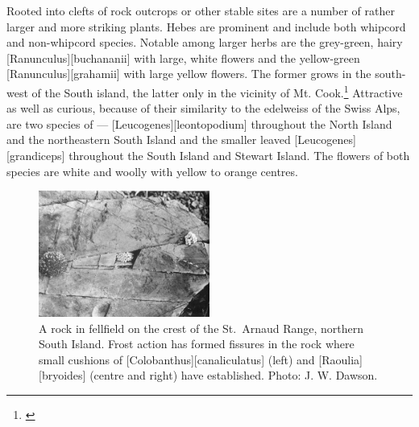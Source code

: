 Rooted into clefts of rock outcrops or other stable sites are a number of rather larger and more striking plants.
Hebes are prominent and include both whipcord and non-whipcord species.
Notable among larger herbs are the grey-green, hairy [Ranunculus][buchananii] with large, white flowers and the yellow-green [Ranunculus][grahamii] with large yellow flowers.
The former grows in the south-west of the South island, the latter only in the vicinity of Mt.
Cook.\footnote{\cite{wilson1978wild}}
Attractive as well as curious, because of their similarity to the edelweiss of the Swiss Alps, are two species of  --- [Leucogenes][leontopodium] throughout the North Island and the northeastern South Island and the smaller leaved [Leucogenes][grandiceps] throughout the South Island and Stewart Island.
The flowers of both species are white and woolly with yellow to orange centres.

\begin{figure}
	\includegraphics[width=0.5\textwidth]{graphics/figure107fellfield-rock.jpg}
	\centering
	\caption[A rock in fellfield on the crest of the St.\ Arnaud Range]{A rock in fellfield on the crest of the St.\ Arnaud Range, northern South Island.
	Frost action has formed fissures in the rock where small cushions of [Colobanthus][canaliculatus] (left) and [Raoulia][bryoides] (centre and right) have established.
	Photo: J. W. Dawson.}%
	\label{fig:107fellfield-rock}
\end{figure}

